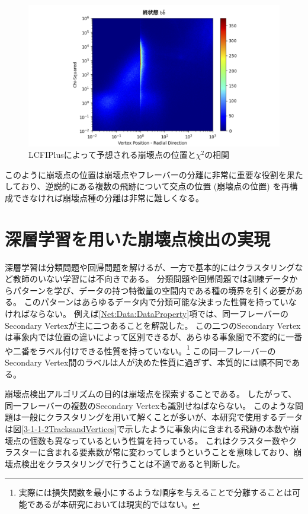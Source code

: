 \begin{figure}[htbp]
 \centering
 \includegraphics[width=1.0\textwidth, clip]{Figure/3Networks/3-1-2-4VertexPositionsvsChiSquare.png}
 \caption{LCFIPlusによって予想される崩壊点の位置と$\chi^2$の相関}
 \label{3-1-2-4VertexPositionsvsChiSquare}
\end{figure}

このように崩壊点の位置は崩壊点やフレーバーの分離に非常に重要な役割を果たしており、逆説的にある複数の飛跡について交点の位置 (崩壊点の位置) を再構成できなければ崩壊点種の分離は非常に難しくなる。


\section{深層学習を用いた崩壊点検出の実現} \label{Net:forVertexFinderwithDL}

深層学習は分類問題や回帰問題を解けるが、一方で基本的にはクラスタリングなど教師のいない学習には不向きである。
分類問題や回帰問題では訓練データからパターンを学び、データの持つ特徴量の空間内である種の境界を引く必要がある。
このパターンはあらゆるデータ内で分類可能な決まった性質を持っていなければならない。
例えば\ref{Net:Data:DataProperty}項では、同一フレーバーのSecondary Vertexが主に二つあることを解説した。
この二つのSecondary Vertexは事象内では位置の違いによって区別できるが、あらゆる事象間で不変的に一番や二番をラベル付けできる性質を持っていない。\footnote{実際には損失関数を最小にするような順序を与えることで分離することは可能であるが本研究においては現実的ではない。}
この同一フレーバーのSecondary Vertex間のラベルは人が決めた性質に過ぎず、本質的には順不同である。

崩壊点検出アルゴリズムの目的は崩壊点を探索することである。
したがって、同一フレーバーの複数のSecondary Vertexも識別せねばならない。
このような問題は一般にクラスタリングを用いて解くことが多いが、本研究で使用するデータは図\ref{3-1-1-2TracksandVertices}で示したように事象内に含まれる飛跡の本数や崩壊点の個数も異なっているという性質を持っている。
これはクラスター数やクラスターに含まれる要素数が常に変わってしまうということを意味しており、崩壊点検出をクラスタリングで行うことは不適であると判断した。

